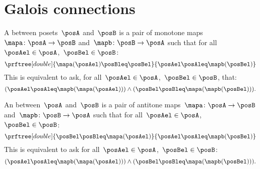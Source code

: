 


\section{Galois connections}\label{subsec:galois-connections}

\begin{ctdefinition}
    A \emph{} between posets~$\posA$ and~$\posB$ is a pair of monotone maps~$\mapa\colon \posA\to \posB$ and~$\mapb\colon \posB\to \posA$ such that for all~$\posAel\in \posA$,~$\posBel\in \posB$:
    \begin{equation}
        \prftree[double]{\mapa(\posAel) \posBleq \posBel}{\posAel \posAleq \mapb(\posBel)}
    \end{equation}
    This is equivalent to ask, for all~$\posAel\in \posA$,~$\posBel\in \posB$, that:
    \begin{equation}
    (\posAel\posAleq \mapb(\mapa(\posAel)))
        \wedge (\posBel\posBleq \mapa(\mapb(\posBel))).
    \end{equation}
\end{ctdefinition}

\begin{ctdefinition}
    An \emph{} between~$\posA$ and~$\posB$ is a pair of antitone maps~$\mapa\colon \posA\to \posB$ and~$\mapb \colon \posB\to \posA$ such that for all~$\posAel\in \posA$,~$\posBel\in \posB$:
    \begin{equation}
        \prftree[double]{\posBel \posBleq \mapa(\posAel)}{\posAel \posAleq \mapb(\posBel)}
    \end{equation}
    This is equivalent to ask for all~$\posAel\in \posA$,~$\posBel\in \posB$:
    \begin{equation}
    (\posAel \posAleq \mapb(\mapa(\posAel)))
        \wedge  (\posBel \posBleq \mapa(\mapb(\posBel))).
    \end{equation}
\end{ctdefinition}

